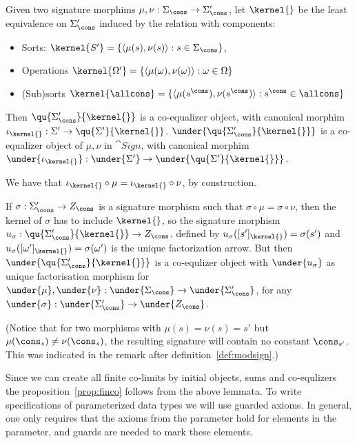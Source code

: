 \begin{fact}\label{fa:coeq}
Given two signature morphims $\mu,\nu:\Sigma_\cons \to \Sigma'_\cons$, let $\kernel{}$ be the least equivalence on $\Sigma'_\cons$ induced by the relation with components:
	\begin{itemize}
	\item Sorts: $\kernel{S'}= \{ \langle \mu(s),\nu(s) \rangle: s \in \Sigma_\cons \}$,
	\item Operations $\kernel{\Omega'}= \{ \langle \mu(\omega), \nu(\omega) \rangle : \omega \in \Omega \}$	
	\item (Sub)sorts $\kernel{\allcons}= \{ \langle \mu(s^\cons), \nu(s^\cons) \rangle : s^\cons \in \allcons \}$
	\end{itemize} 
%
Then $\qu{\Sigma'_\cons}{\kernel{}}$ is a co-equalizer object, with canonical
morphim $\iota_{\kernel{}}: \Sigma' \to \qu{\Sigma'}{\kernel{}}$.
$\under{\qu{\Sigma'_\cons}{\kernel{}}}$ is a co-equalizer object of $\mu,\nu$
in
$\cat{Sign}$, with canonical morphim $\under{\iota_{\kernel{}}}:
\under{\Sigma'} \to \under{\qu{\Sigma'}{\kernel{}}}$.
\end{fact}
%
\begin{PROOF} We have that $\iota_{\kernel{}} \circ \mu = \iota_{\kernel{}} \circ \nu$, by construction.

If $\sigma:\Sigma'_\cons \to Z_\cons$ is a signature morphism such
that $\sigma \circ \mu = \sigma \circ \nu$, then the kernel of $\sigma$ has
to include $\kernel{}$, so the signature morphism $u_{\sigma}:
\qu{\Sigma'_\cons}{\kernel{}} \to Z_\cons$, defined by
$u_{\sigma}([s']_{\kernel{}})= \sigma(s')$ and
$u_{\sigma}([\omega']_{\kernel{}})= \sigma(\omega')$ is the unique
factorization arrow. But then $\under{\qu{\Sigma'_\cons}{\kernel{}}}$ is a
co-equlizer object with $\under{u_{\sigma}}$ as unique factorisation morphism
for $\under{\mu},\under{\nu}:\under{\Sigma_\cons} \to \under{\Sigma'_\cons}$,
for any $\under{\sigma}:\under{\Sigma'_\cons} \to \under{Z_\cons}$.
\end{PROOF}
%
(Notice that for two morphisms with $\mu(s)=\nu(s)=s'$ but
$\mu(\cons_s)\not=\nu(\cons_s)$, the resulting signature will contain no
constant $\cons_{s'}$. This was indicated in the remark after definition~\ref{def:modsign}.)

Since we can create all finite co-limits by initial objects, sums and
co-equlizers the proposition~\ref{prop:finco} follows from the above lemmata.
%
%
%
To write specifications of parameterized data types we will use guarded
axioms. In general, one only requires that the axioms from the parameter
hold for elements in the parameter, and guards are needed to mark these elements.

